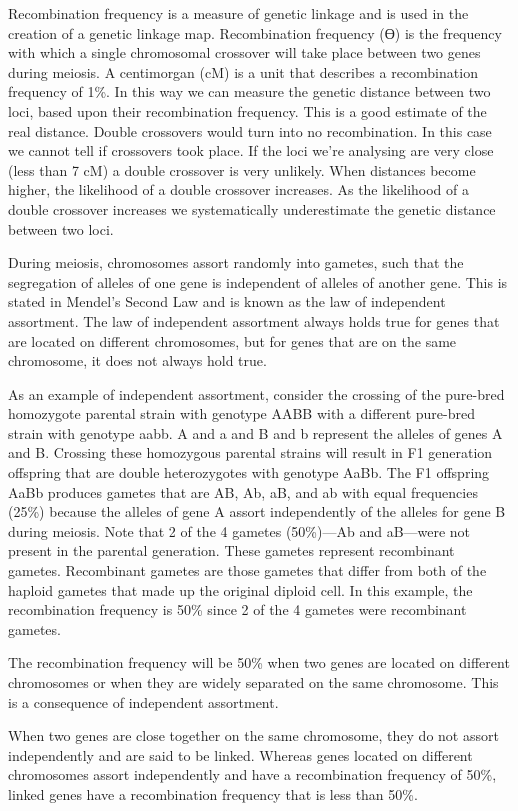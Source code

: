 Recombination frequency is a measure of genetic linkage and is used in the creation of a genetic linkage map. Recombination frequency (ϴ) is the frequency with which a single chromosomal crossover will take place between two genes during meiosis. A centimorgan (cM) is a unit that describes a recombination frequency of 1\%. In this way we can measure the genetic distance between two loci, based upon their recombination frequency. This is a good estimate of the real distance. Double crossovers would turn into no recombination. In this case we cannot tell if crossovers took place. If the loci we're analysing are very close (less than 7 cM) a double crossover is very unlikely. When distances become higher, the likelihood of a double crossover increases. As the likelihood of a double crossover increases we systematically underestimate the genetic distance between two loci.

During meiosis, chromosomes assort randomly into gametes, such that the segregation of alleles of one gene is independent of alleles of another gene. This is stated in Mendel's Second Law and is known as the law of independent assortment. The law of independent assortment always holds true for genes that are located on different chromosomes, but for genes that are on the same chromosome, it does not always hold true.

As an example of independent assortment, consider the crossing of the pure-bred homozygote parental strain with genotype AABB with a different pure-bred strain with genotype aabb. A and a and B and b represent the alleles of genes A and B. Crossing these homozygous parental strains will result in F1 generation offspring that are double heterozygotes with genotype AaBb. The F1 offspring AaBb produces gametes that are AB, Ab, aB, and ab with equal frequencies (25\%) because the alleles of gene A assort independently of the alleles for gene B during meiosis. Note that 2 of the 4 gametes (50\%)---Ab and aB---were not present in the parental generation. These gametes represent recombinant gametes. Recombinant gametes are those gametes that differ from both of the haploid gametes that made up the original diploid cell. In this example, the recombination frequency is 50\% since 2 of the 4 gametes were recombinant gametes.

The recombination frequency will be 50\% when two genes are located on different chromosomes or when they are widely separated on the same chromosome. This is a consequence of independent assortment.

When two genes are close together on the same chromosome, they do not assort independently and are said to be linked. Whereas genes located on different chromosomes assort independently and have a recombination frequency of 50\%, linked genes have a recombination frequency that is less than 50\%.

